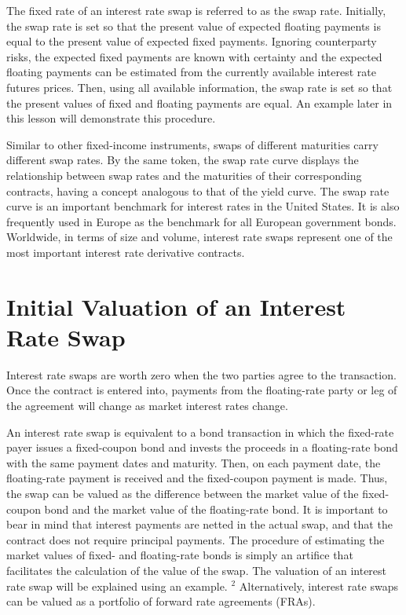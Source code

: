 \documentclass[11pt]{article}
\begin{document}
The fixed rate of an interest rate swap is referred to as the swap rate. Initially, the swap rate is set so that the present value of expected floating payments is equal to the present value of expected fixed payments. Ignoring counterparty risks, the expected fixed payments are known with certainty and the expected floating payments can be estimated from the currently available interest rate futures prices. Then, using all available information, the swap rate is set so that the present values of fixed and floating payments are equal. An example later in this lesson will demonstrate this procedure.

Similar to other fixed-income instruments, swaps of different maturities carry different swap rates. By the same token, the swap rate curve displays the relationship between swap rates and the maturities of their corresponding contracts, having a concept analogous to that of the yield curve. The swap rate curve is an important benchmark for interest rates in the United States. It is also frequently used in Europe as the benchmark for all European government bonds. Worldwide, in terms of size and volume, interest rate swaps represent one of the most important interest rate derivative contracts.

\section*{Initial Valuation of an Interest Rate Swap}
Interest rate swaps are worth zero when the two parties agree to the transaction. Once the contract is entered into, payments from the floating-rate party or leg of the agreement will change as market interest rates change.

An interest rate swap is equivalent to a bond transaction in which the fixed-rate payer issues a fixed-coupon bond and invests the proceeds in a floating-rate bond with the same payment dates and maturity. Then, on each payment date, the floating-rate payment is received and the fixed-coupon payment is made. Thus, the swap can be valued as the difference between the market value of the fixed-coupon bond and the market value of the floating-rate bond. It is important to bear in mind that interest payments are netted in the actual swap, and that the contract does not require principal payments. The procedure of estimating the market values of fixed- and floating-rate bonds is simply an artifice that facilitates the calculation of the value of the swap. The valuation of an interest rate swap will be explained using an example. ${ }^{2}$ Alternatively, interest rate swaps can be valued as a portfolio of forward rate agreements (FRAs).
\end{document}
